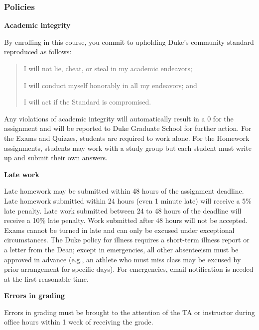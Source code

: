 \documentclass[
  letterpaper,
  DIV=11,
  numbers=noendperiod]{scrartcl}
\begin{document}
\hypertarget{policies}{%
\subsubsection{Policies}\label{policies}}

\textbf{Academic integrity}

By enrolling in this course, you commit to upholding Duke's community
standard reproduced as follows:

\begin{quote}
I will not lie, cheat, or steal in my academic endeavors;

I will conduct myself honorably in all my endeavors; and

I will act if the Standard is compromised.
\end{quote}

Any violations of academic integrity will automatically result in a 0
for the assignment and will be reported to Duke Graduate School for
further action. For the Exams and Quizzes, students are required to work
alone. For the Homework assignments, students may work with a study
group but each student must write up and submit their own answers.

\newpage

\textbf{Late work}

Late homework may be submitted within 48 hours of the assignment
deadline. Late homework submitted within 24 hours (even 1 minute late)
will receive a 5\% late penalty. Late work submitted between 24 to 48
hours of the deadline will receive a 10\% late penalty. Work submitted
after 48 hours will not be accepted. Exams cannot be turned in late and
can only be excused under exceptional circumstances. The Duke policy for
illness requires a short-term illness report or a letter from the Dean;
except in emergencies, all other absenteeism must be approved in advance
(e.g., an athlete who must miss class may be excused by prior
arrangement for specific days). For emergencies, email notification is
needed at the first reasonable time.

\textbf{Errors in grading}

Errors in grading must be brought to the attention of the TA or
instructor during office hours within 1 week of receiving the grade.
\end{document}
